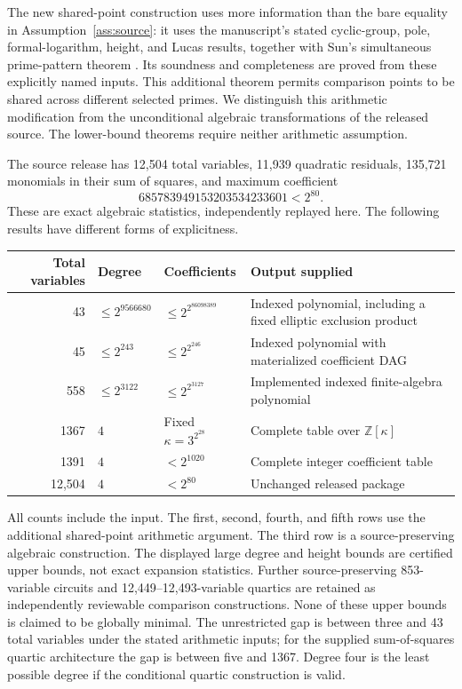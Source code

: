 \documentclass[11pt]{article}
\theoremstyle{definition}
\begin{document}
The new shared-point construction uses more information than the bare
equality in Assumption~\ref{ass:source}: it uses the manuscript's stated
cyclic-group, pole, formal-logarithm, height, and Lucas results, together
with Sun's simultaneous prime-pattern theorem
\cite[Theorem~4.1]{Sun2026Rational86}. Its soundness and completeness
are proved from these explicitly named inputs. This additional theorem
permits comparison points to be shared across different selected primes.
We distinguish this arithmetic modification from the unconditional
algebraic transformations of the released source. The lower-bound
theorems require neither arithmetic assumption.

The source release has 12,504 total variables, 11,939 quadratic
residuals, 135,721 monomials in their sum of squares, and maximum
coefficient
\[
 685783949153203534233601<2^{80}.
\]
These are exact algebraic statistics, independently replayed here.
The following results have different forms of explicitness.

\begin{center}
\small
\begin{tabular}{r l l p{43mm}}
\toprule
Total variables & Degree & Coefficients & Output supplied\\
\midrule
43 & $\le2^{9566680}$ & $\le2^{2^{86098389}}$ & Indexed polynomial, including a fixed elliptic exclusion product\\
45 & $\le2^{243}$ & $\le2^{2^{246}}$ & Indexed polynomial with materialized coefficient DAG\\
558 & $\le2^{3122}$ & $\le2^{2^{3127}}$ & Implemented indexed finite-algebra polynomial\\
1367 & $4$ & Fixed $\kappa=3^{2^{28}}$ & Complete table over $\mathbb Z[\kappa]$\\
1391 & $4$ & $<2^{1020}$ & Complete integer coefficient table\\
12,504 & $4$ & $<2^{80}$ & Unchanged released package\\
\bottomrule
\end{tabular}
\end{center}

All counts include the input. The first, second, fourth, and fifth rows
use the additional shared-point arithmetic argument. The third row is a
source-preserving algebraic construction. The displayed large degree and
height bounds are certified upper bounds, not exact expansion statistics.
Further source-preserving 853-variable circuits and 12,449--12,493-variable
quartics are retained as independently reviewable comparison constructions.
None of these upper bounds is claimed to be globally minimal. The
unrestricted gap is between three and 43 total variables under the stated
arithmetic inputs; for the supplied sum-of-squares quartic architecture
the gap is between five and 1367. Degree four is the least possible
degree if the conditional quartic construction is valid.
\end{document}
